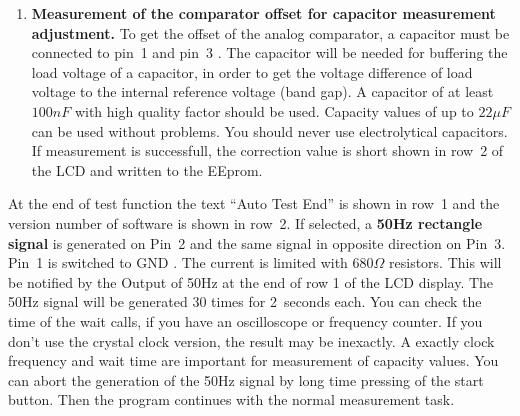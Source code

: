 \begin{enumerate}
\item {\bf Measurement of the comparator offset for capacitor measurement adjustment.}
To get the offset of the analog comparator, a capacitor must be connected to pin~1 and pin~3 .
The capacitor will be needed for buffering the load voltage of a capacitor, in order to get the voltage
difference of load voltage to the internal reference voltage (band gap).
A capacitor of at least \(100 nF\) with high quality factor should be used.
Capacity values of up to \(22 \mu F\) can be used without problems.
You should never use electrolytical capacitors.
If measurement is successfull, the correction value is short shown in row~2 of the LCD and written to the EEprom.

\end{enumerate}

At the end of test function the text ``Auto Test End''  is shown in row~1 and the version number of software is shown in row~2.
If selected, a {\bf 50Hz rectangle signal} is generated on Pin~2 and the same signal in opposite direction on Pin~3.
Pin~1 is switched to GND . The current is limited with \(680\Omega\) resistors.
This will be notified by the Output of 50Hz at the end of row 1 of the LCD display.
The 50Hz signal will be generated 30 times for 2~seconds each.
You can check the time of the wait calls, if you have an oscilloscope or frequency counter.
If you don't use the crystal clock version, the result may be inexactly.
A exactly clock frequency and wait time are important for measurement of capacity values.
You can abort the generation of the 50Hz signal by long time pressing of the start button.
Then the program continues with the normal measurement task.


